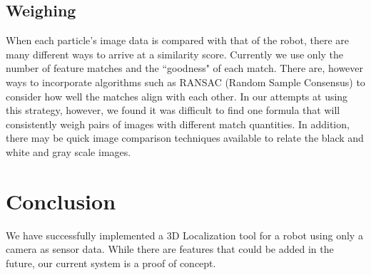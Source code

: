 \documentclass[a4paper,11pt]{article}
\begin{document}
\subsection{Weighing}
When each particle's image data is compared with that of the robot, there are many different ways to arrive at a similarity score. Currently we use only the number of feature matches and the ``goodness" of each match. There are, however ways to incorporate algorithms such as RANSAC (Random Sample Consensus) to consider how well the matches align with each other. In our attempts at using this strategy, however, we found it was difficult to find one formula that will consistently weigh pairs of images with different match quantities. In addition, there may be quick image comparison techniques available to relate the black and white and gray scale images.

\section{Conclusion}
We have successfully implemented a 3D Localization tool for a robot using only a camera as sensor data. While there are features that could be added in the future, our current system is a proof of concept.








  
\end{document}
